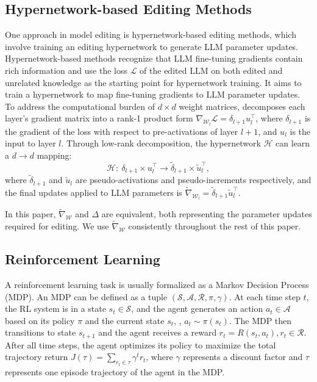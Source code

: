 \subsection{Hypernetwork-based Editing Methods}
One approach in model editing is hypernetwork-based editing methods, which involve training an editing hypernetwork to generate LLM parameter updates. Hypernetwork-based methods recognize that LLM fine-tuning gradients contain rich information and use the loss $\mathcal{L}$ of the edited LLM on both edited and unrelated knowledge as the starting point for hypernetwork training. It aims to train a hypernetwork to map fine-tuning gradients to LLM parameter updates. To address the computational burden of $d\times d$ weight matrices, \citet{mend} decomposes each layer's gradient matrix into a rank-1 product form $\nabla_{\mathcal{W}_l}\mathcal{L}=\delta_{l+1} u_l^\top$, where $\delta_{l+1}$ is the gradient of the loss with respect to pre-activations of layer $l+1$, and $u_l$ is the input to layer $l$. Through low-rank decomposition, the hypernetwork $\mathcal{H}$ can learn a $d\rightarrow d$ mapping:
\begin{equation}
    \mathcal{H}:\ \delta_{l+1}\times u_l^\top \rightarrow \tilde{\delta}_{l+1}\times \tilde{u}_l^\top,
\end{equation}
where $\tilde{\delta}_{l+1}$ and $\tilde{u}_l$ are pseudo-activations and pseudo-increments respectively, and the final updates applied to LLM parameters is $\tilde{\nabla}_{\mathcal{W}_l}=\tilde{\delta}_{l+1}\tilde{u}_l^\top$. 

In this paper, $\tilde{\nabla}_\mathcal{W}$ and $\Delta$ are equivalent, both representing the parameter updates required for editing. We use $\tilde{\nabla}_{\mathcal{W}}$ consistently throughout the rest of this paper.


\subsection{Reinforcement Learning}
A reinforcement learning task is usually formalized as a Markov Decision Process (MDP). An MDP can be defined as a tuple $(\mathcal{S}, \mathcal{A}, \mathcal{R}, \pi, \gamma)$. At each time step $t$, the RL system is in a state $s_t\in \mathcal{S}$, and the agent generates an action $a_t\in \mathcal{A}$ based on its policy $\pi$ and the current state $s_t$, \ie, $a_t\sim\pi(s_t)$. The MDP then transitions to state $s_{t+1}$ and the agent receives a reward $r_t=R(s_t, a_t), r_t \in \mathcal{R}$. After all time steps, the agent optimizes its policy to maximize the total trajectory return $J(\tau)=\sum_{r_t\in \tau}\gamma^tr_t$, where $\gamma$ represents a discount factor and $\tau$ represents one episode trajectory of the agent in the MDP.